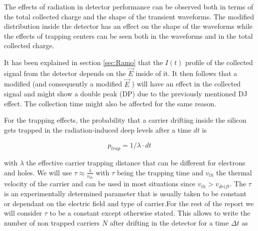 

The effects of radiation in detector performance can be observed both in terms of the total collected charge and the shape of the transient waveforms. The modified \neff distribution inside the detector has an effect on the shape of the waveforms while the effects of trapping centers can be seen both in the waveforms and in the total collected charge.

It has been explained in section \ref{sec:Ramo} that the  $ I (t) $ profile of the collected signal from the detector depends on the $\overrightarrow E $ inside of it. It then follows that a modified \neff  (and consequently a modified  $\overrightarrow E$ ) will have an effect in the collected signal and might show a double peak (DP) due to the previously mentioned DJ effect. The collection time might also be affected for the same reason.

For the trapping effects, the probability that a carrier drifting inside the silicon gets trapped in the radiation-induced deep levels after a time $dt$ is

\[p_{trap} = 1/\lambda \cdot dt\] %

with $\lambda$ the effective carrier trapping distance that can be different for electrons and holes. We will use $\tau \approx \frac{\lambda}{v_{th}}$ with $\tau$ being the trapping time and $v_{th}$ the thermal velocity of the carrier and can be used in most situations\cite{Kramberger} since $v_{th} > v_{drift}$. The $\tau$ is an experimentally determined parameter that is usually taken to be constant or dependant on the electric field and type of carrier.For the rest of the report we will consider $\tau$ to be a constant except otherwise stated. This allows to write the number of non trapped carriers $N$ after drifting in the detector for a time $\Delta t$ as


